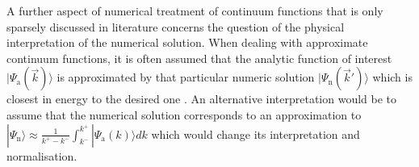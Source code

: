 A further aspect of numerical treatment of continuum functions that is only sparsely discussed in literature concerns the question of the physical interpretation of the numerical solution.
When dealing with approximate continuum functions, it is often assumed that the analytic function of interest $|\Psi_\text{a}(\vec{k})\rangle$ is approximated by that particular numeric solution $|\Psi_\text{n}(\vec{k}')\rangle$ which is closest in energy to the desired one \cite{H2pDeCleva}. %
An alternative interpretation would be to assume that the numerical solution corresponds to an approximation to $|\Psi_\text{n}\rangle \approx \frac{1}{k^+-k^-} \int_{k^-}^{k^+}|\Psi_\text{a}(k) \rangle dk$ which would change its interpretation and normalisation.
%


